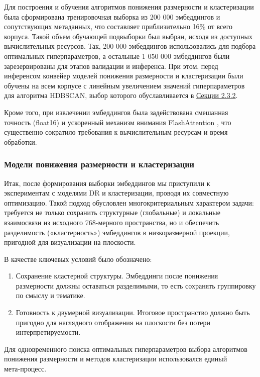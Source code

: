 Для построения и обучения алгоритмов понижения размерности и кластеризации была сформирована
тренировочная выборка из 200 000 эмбеддингов и сопутствующих метаданных, что составляет приблизительно
16\% от всего корпуса. Такой объем обучающей подвыборки был выбран, исходя из доступных вычислительных
ресурсов. Так, 200 000 эмбеддингов использовались для подбора оптимальных гиперпараметров,
а остальные 1 050 000 эмбеддингов были зарезервированы для этапов валидации и инференса.
При этом, перед инференсом конвейер моделей понижения размерности и кластеризации были обучены
на всем корпусе с линейным увеличением значений гиперпараметров для алгоритма HDBSCAN, выбор которого
обуславливается в \hyperref[sec:drc]{Секции 2.3.2}.

Кроме того, при извлечении эмбеддингов была задействована смешанная точность (float16) и ускоренный
механизм внимания FlashAttention \parencite{flash2022attention}, что существенно сократило требования
к вычислительным ресурсам и время обработки.

\subsubsection{Модели понижения размерности и кластеризации}
\label{sec:drc}
Итак, после формирования выборки эмбеддингов мы приступили к экспериментам с моделями DR и кластеризации,
проводя их совместную оптимизацию. Такой подход обусловлен многокритериальным характером задачи: требуется
не только сохранить структурные (глобальные) и локальные взаимосвязи из исходного 768-мерного пространства,
но и обеспечить разделимость («кластерность») эмбеддингов в низкоразмерной проекции, пригодной для визуализации на плоскости.

В качестве ключевых условий было обозначено:

\begin{enumerate}
    \item Сохранение кластерной структуры. Эмбеддинги после понижения размерности должны оставаться разделимыми,
    то есть сохранять группировку по смыслу и тематике.
    \item Готовность к двумерной визуализации. Итоговое пространство должно быть пригодно для наглядного
    отображения на плоскости без потери интерпретируемости.
\end{enumerate}

Для одновременного поиска оптимальных гиперпараметров выбора алгоритмов понижения размерности
и методов кластеризации использовался единый мета‑процесс.

